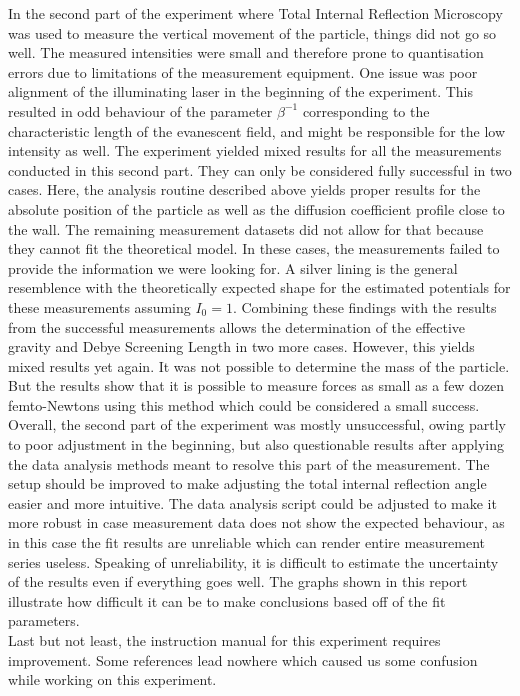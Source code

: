 \documentclass[
    twoside=false,
    twocolumn=true,
    fontsize=11pt,
]{scrarticle}
\begin{document}
In the second part of the experiment where Total Internal Reflection Microscopy was used to measure the vertical movement of the particle, things did not go so well. The measured intensities were small and therefore prone to quantisation errors due to limitations of the measurement equipment. One issue was poor alignment of the illuminating laser in the beginning of the experiment. This resulted in odd behaviour of the parameter $\beta^{-1}$ corresponding to the characteristic length of the evanescent field, and might be responsible for the low intensity as well. The experiment yielded mixed results for all the measurements conducted in this second part. They can only be considered fully successful in two cases. Here, the analysis routine described above yields proper results for the absolute position of the particle as well as the diffusion coefficient profile close to the wall. The remaining measurement datasets did not allow for that because they cannot fit the theoretical model. In these cases, the measurements failed to provide the information we were looking for. A silver lining is the general resemblence with the theoretically expected shape for the estimated potentials for these measurements assuming $I_0=1$. Combining these findings with the results from the successful measurements allows the determination of the effective gravity and Debye Screening Length in two more cases. However, this yields mixed results yet again. It was not possible to determine the mass of the particle. But the results show that it is possible to measure forces as small as a few dozen femto-Newtons using this method which could be considered a small success. Overall, the second part of the experiment was mostly unsuccessful, owing partly to poor adjustment in the beginning, but also questionable results after applying the data analysis methods meant to resolve this part of the measurement. The setup should be improved to make adjusting the total internal reflection angle easier and more intuitive. The data analysis script could be adjusted to make it more robust in case measurement data does not show the expected behaviour, as in this case the fit results are unreliable which can render entire measurement series useless. Speaking of unreliability, it is difficult to estimate the uncertainty of the results even if everything goes well. The graphs shown in this report illustrate how difficult it can be to make conclusions based off of the fit parameters.\\
Last but not least, the instruction manual \autocite{instructions} for this experiment requires improvement. Some references lead nowhere which caused us some confusion while working on this experiment.


\nocite{*}
\printbibliography
\end{document}
